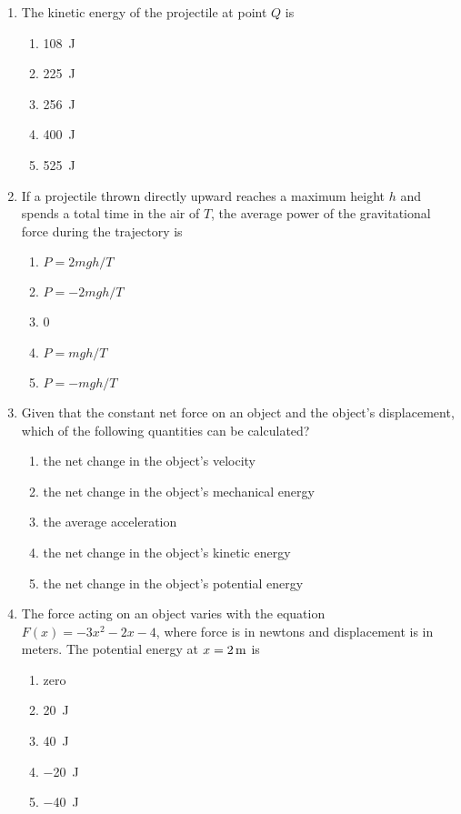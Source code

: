 \documentclass{../../../oss-classkick}
\begin{document}
\begin{multicols}{2}
\begin{enumerate}[leftmargin=18pt,resume]
  \item The kinetic energy of the projectile at point $Q$ is
    \label{q:pq2}
    \begin{enumerate}[nosep,leftmargin=18pt,label=(\Alph*)]
    \item\SI{108}{\joule}
    \item\SI{225}{\joule}
    \item\SI{256}{\joule}
    \item\SI{400}{\joule}
    \item\SI{525}{\joule}
    \end{enumerate}
    
  \item If a projectile thrown directly upward reaches a maximum height $h$ and
    spends a total time in the air of $T$, the average power of the
    gravitational force during the trajectory is
    \begin{enumerate}[nosep,leftmargin=18pt,label=(\Alph*)]
    \item $P=2mgh/T$
    \item $P=-2mgh/T$
    \item 0
    \item $P=mgh/T$
    \item $P=-mgh/T$
    \end{enumerate}

  \item Given that the constant net force on an object and the object's 
    displacement, which of the following quantities can be calculated?
    \begin{enumerate}[nosep,leftmargin=18pt,label=(\Alph*)]
    \item the net change in the object's velocity
    \item the net change in the object's mechanical energy
    \item the average acceleration
    \item the net change in the object's kinetic energy
    \item the net change in the object's potential energy
    \end{enumerate}
    \vspace{.5in}
    
  \item The force acting on an object varies with the equation
    $F(x)=-3x^2-2x-4$, where force is in newtons and displacement is in meters.
    The potential energy at $x=\SI2{\metre}$ is
    \begin{enumerate}[nosep,leftmargin=18pt,label=(\Alph*)]
    \item zero
    \item\SI{20}{\joule}
    \item\SI{40}{\joule}
    \item\SI{-20}{\joule}
    \item\SI{-40}{\joule}
    \end{enumerate}
    \columnbreak
    

\end{enumerate}
\end{multicols}
\end{document}
